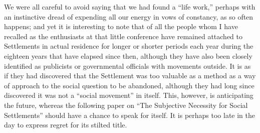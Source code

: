 We were all careful to avoid saying that we had found a ``life work,''
perhaps with an instinctive dread of expending all our energy in vows
of constancy, as so often happens; and yet it is interesting to note
that of all the people whom I have  recalled as the
enthusiasts at that little conference have remained attached to
Settlements in actual residence for longer or shorter periods each
year during the eighteen years that have elapsed since then, although
they have also been closely identified as publicists or governmental
officials with movements outside. It is as if they had discovered that
the Settlement was too valuable as a method as a way of approach to
the social question to be abandoned, although they had long since
discovered it was not a ``social movement'' in itself. This, however,
is anticipating the future, whereas the following paper on ``The
Subjective Necessity for Social Settlements'' should have a chance to
speak for itself. It is perhaps too late in the day to express regret
for its stilted title.

\vspace{1\baselineskip}


